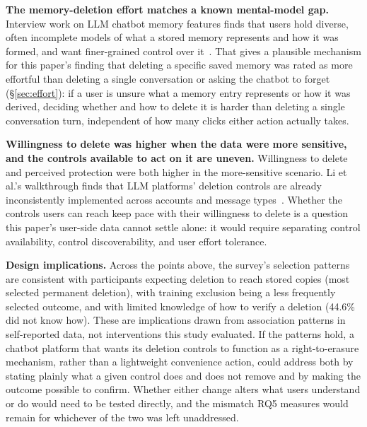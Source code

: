 \documentclass[conference,compsoc]{IEEEtran}
\begin{document}
\textbf{The memory-deletion effort matches a known mental-model gap.}
Interview work on LLM chatbot memory features finds that users hold
diverse, often incomplete models of what a stored memory represents
and how it was formed, and want finer-grained control over
it~\cite{zhang2025understanding}. That gives a plausible mechanism for
this paper's finding that deleting a specific saved memory was rated as
more effortful than deleting a single conversation or asking the chatbot
to forget (\S\ref{sec:effort}): if a user is unsure what a memory
entry represents or how it was derived, deciding whether and how to
delete it is harder than deleting a single conversation turn, independent
of how many clicks either action actually takes.

\textbf{Willingness to delete was higher when the data were more sensitive,
and the controls available to act on it are uneven.} Willingness to delete and
perceived protection were both higher in the more-sensitive scenario. Li et al.'s
walkthrough finds that LLM platforms' deletion controls are already
inconsistently implemented across accounts and message types~\cite{li2026privacy}.
Whether the controls users can reach keep pace with their willingness to
delete is a question this paper's user-side data cannot settle alone: it would
require separating control availability, control discoverability, and user
effort tolerance.

\textbf{Design implications.} Across the points above, the survey's selection
patterns are consistent with participants expecting deletion to reach stored
copies (most selected permanent deletion), with training exclusion being a
less frequently selected outcome, and with limited knowledge of how to verify
a deletion (44.6\% did not know how). These are implications drawn from
association patterns in self-reported data, not interventions this study
evaluated. If the patterns hold, a chatbot platform that wants its deletion
controls to function as a right-to-erasure mechanism, rather than a
lightweight convenience action, could address both by stating plainly what a
given control does and does not remove and by making the outcome possible to
confirm. Whether either change alters what users understand or do would need
to be tested directly, and the mismatch RQ5 measures would remain for
whichever of the two was left unaddressed.
\end{document}
